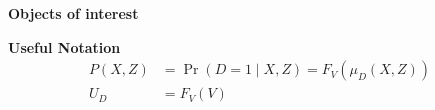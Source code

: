 \begin{frame}\begin{center}
	\LARGE\textbf{Objects of interest}
\end{center}\end{frame}
\begin{frame}
	\textbf{Useful Notation}
	\begin{align*}
		P(X, Z) & = \Pr(D = 1\mid X, Z) = F_V(\mu_D(X, Z)) \\
		U_D     & = F_V(V)
	\end{align*}
\end{frame}

